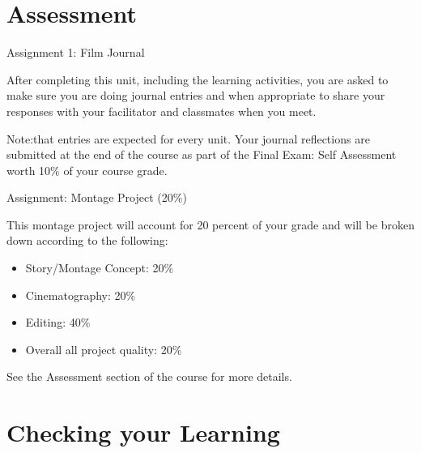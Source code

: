 \documentclass[
]{book}
\providecommand{\tightlist}{%
  \setlength{\itemsep}{0pt}\setlength{\parskip}{0pt}}
\begin{document}
\hypertarget{assessment-11}{%
\section*{Assessment}\label{assessment-11}}

\begin{assessment}
{Assignment 1: Film Journal}

After completing this unit, including the learning activities, you are asked to make sure you are doing journal entries and when appropriate to share your responses with your facilitator and classmates when you meet.

Note:that entries are expected for every unit. Your journal reflections are submitted at the end of the course as part of the Final Exam: Self Assessment worth 10\% of your course grade.

{Assignment: Montage Project (20\%)}

This montage project will account for 20 percent of your grade and will be broken down according to the following:

\begin{itemize}
\tightlist
\item
  Story/Montage Concept: 20\%\\
\item
  Cinematography: 20\%\\
\item
  Editing: 40\%\\
\item
  Overall all project quality: 20\%
\end{itemize}

See the Assessment section of the course for more details.
\end{assessment}

\hypertarget{checking-your-learning-6}{%
\section*{Checking your Learning}\label{checking-your-learning-6}}
\end{document}
